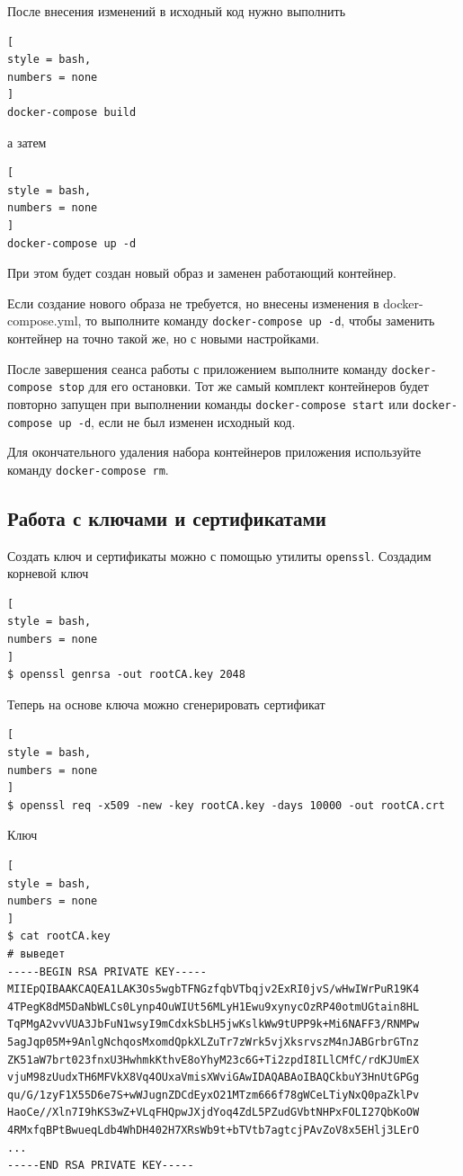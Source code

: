 \documentclass[%
	11pt,
	a4paper,
	utf8,
		]{article}
\begin{document}
После внесения изменений в исходный код нужно выполнить
\begin{lstlisting}[
style = bash,
numbers = none
]
docker-compose build
\end{lstlisting}
а затем 
\begin{lstlisting}[
style = bash,
numbers = none
]
docker-compose up -d
\end{lstlisting}

При этом будет создан новый образ и заменен работающий контейнер.


Если создание нового образа не требуется, но внесены изменения в docker-compose.yml, то выполните команду \texttt{docker-compose up -d}, чтобы заменить контейнер на точно такой же, но с новыми настройками.

После завершения сеанса работы с приложением выполните команду \texttt{docker-compose stop} для его остановки. Тот же самый комплект контейнеров будет повторно запущен при выполнении команды \texttt{docker-compose start} или \texttt{docker-compose up -d}, если не был изменен исходный код.

Для окончательного удаления набора контейнеров приложения используйте команду \texttt{docker-compose rm}.



\subsection{Работа с ключами и сертификатами}

Создать ключ и сертификаты можно с помощью утилиты \texttt{openssl}. Создадим корневой ключ
\begin{lstlisting}[
style = bash,
numbers = none
]
$ openssl genrsa -out rootCA.key 2048
\end{lstlisting}

Теперь на основе ключа можно сгенерировать сертификат
\begin{lstlisting}[
style = bash,
numbers = none
]
$ openssl req -x509 -new -key rootCA.key -days 10000 -out rootCA.crt
\end{lstlisting}

Ключ
\begin{lstlisting}[
style = bash,
numbers = none
]
$ cat rootCA.key
# выведет
-----BEGIN RSA PRIVATE KEY-----
MIIEpQIBAAKCAQEA1LAK3Os5wgbTFNGzfqbVTbqjv2ExRI0jvS/wHwIWrPuR19K4
4TPegK8dM5DaNbWLCs0Lynp4OuWIUt56MLyH1Ewu9xynycOzRP40otmUGtain8HL
TqPMgA2vvVUA3JbFuN1wsyI9mCdxkSbLH5jwKslkWw9tUPP9k+Mi6NAFF3/RNMPw
5agJqp05M+9AnlgNchqosMxomdQpkXLZuTr7zWrk5vjXksrvszM4nJABGrbrGTnz
ZK51aW7brt023fnxU3HwhmkKthvE8oYhyM23c6G+Ti2zpdI8ILlCMfC/rdKJUmEX
vjuM98zUudxTH6MFVkX8Vq4OUxaVmisXWviGAwIDAQABAoIBAQCkbuY3HnUtGPGg
qu/G/1zyF1X55D6e7S+wWJugnZDCdEyxO21MTzm666f78gWCeLTiyNxQ0paZklPv
HaoCe//Xln7I9hKS3wZ+VLqFHQpwJXjdYoq4ZdL5PZudGVbtNHPxFOLI27QbKoOW
4RMxfqBPtBwueqLdb4WhDH402H7XRsWb9t+bTVtb7agtcjPAvZoV8x5EHlj3LErO
...
-----END RSA PRIVATE KEY-----
\end{lstlisting}
\end{document}
